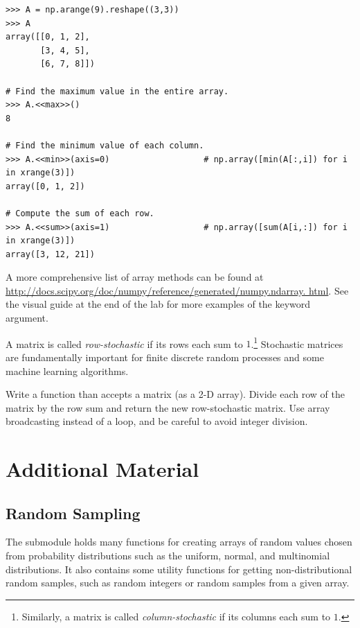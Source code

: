 \begin{lstlisting}
>>> A = np.arange(9).reshape((3,3))
>>> A
array([[0, 1, 2],
       [3, 4, 5],
       [6, 7, 8]])

# Find the maximum value in the entire array.
>>> A.<<max>>()
8

# Find the minimum value of each column.
>>> A.<<min>>(axis=0)                   # np.array([min(A[:,i]) for i in xrange(3)])
array([0, 1, 2])

# Compute the sum of each row.
>>> A.<<sum>>(axis=1)                   # np.array([sum(A[i,:]) for i in xrange(3)])
array([3, 12, 21])
\end{lstlisting}

A more comprehensive list of array methods can be found at
\url{http://docs.scipy.org/doc/numpy/reference/generated/numpy.ndarray.
html}.
See the visual guide at the end of the lab for more examples of the  keyword argument.

\begin{problem} %
A matrix is called \emph{row-stochastic} if its rows each sum to $1$.\footnote{Similarly, a matrix is called \emph{column-stochastic} if its columns each sum to $1$.}
Stochastic matrices are fundamentally important for finite discrete random processes and some machine learning algorithms.

Write a function than accepts a matrix (as a 2-D array).
Divide each row of the matrix by the row sum and return the new row-stochastic matrix.
Use array broadcasting instead of a loop, and be careful to avoid integer division.
\end{problem}

\newpage %

\section*{Additional Material} %

\subsection*{Random Sampling} %

The submodule  holds many functions for creating arrays of random values chosen from probability distributions such as the uniform, normal, and multinomial distributions.
It also contains some utility functions for getting non-distributional random samples, such as random integers or random samples from a given array.

